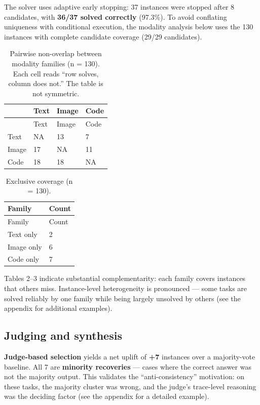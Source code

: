 \documentclass[10pt]{article}
\begin{document}
The solver uses adaptive early stopping: 37 instances were stopped after
8 candidates, with \textbf{36/37 solved correctly} (97.3\%). To avoid
conflating uniqueness with conditional execution, the modality analysis
below uses the 130 instances with complete candidate coverage (29/29
candidates).

\begin{longtable}[]{@{}llll@{}}
\caption{Pairwise non-overlap between modality families (n = 130). Each
cell reads ``row solves, column does not.'' The table is not
symmetric.}\tabularnewline
\toprule\noalign{}
& Text & Image & Code \\
\midrule\noalign{}
\endfirsthead
\toprule\noalign{}
& Text & Image & Code \\
\midrule\noalign{}
\endhead
\bottomrule\noalign{}
\endlastfoot
Text & NA & 13 & 7 \\
Image & 17 & NA & 11 \\
Code & 18 & 18 & NA \\
\end{longtable}

\begin{longtable}[]{@{}ll@{}}
\caption{Exclusive coverage (n = 130).}\tabularnewline
\toprule\noalign{}
Family & Count \\
\midrule\noalign{}
\endfirsthead
\toprule\noalign{}
Family & Count \\
\midrule\noalign{}
\endhead
\bottomrule\noalign{}
\endlastfoot
Text only & 2 \\
Image only & 6 \\
Code only & 7 \\
\end{longtable}

Tables 2--3 indicate substantial complementarity: each family covers
instances that others miss. Instance-level heterogeneity is pronounced
--- some tasks are solved reliably by one family while being largely
unsolved by others (see the appendix for additional examples).

\hypertarget{judging-and-synthesis}{%
\subsection{Judging and synthesis}\label{judging-and-synthesis}}

\textbf{Judge-based selection} yields a net uplift of \textbf{+7}
instances over a majority-vote baseline. All 7 are \textbf{minority
recoveries} --- cases where the correct answer was not the majority
output. This validates the ``anti-consistency'' motivation: on these
tasks, the majority cluster was wrong, and the judge's trace-level
reasoning was the deciding factor (see the appendix for a detailed
example).
\end{document}
